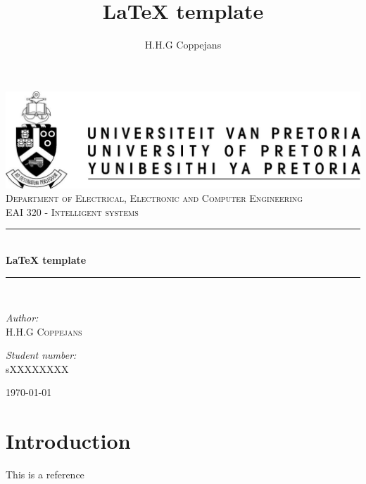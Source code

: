\documentclass[a4paper,12pt]{report}
\author{H.H.G Coppejans}
\title{ LaTeX template}
\newcommand{\HRule}{\rule{\linewidth}{0.5mm}}
\begin{document}
\setlength{\parskip}{6pt}
\begin{titlepage}

\begin{center}
\includegraphics[width=1\textwidth]{./up-logo.jpg}\\[0.4cm]    
\textsc{\LARGE Department of Electrical, Electronic and Computer Engineering}\\[1.5cm]
\textsc{\Large EAI 320 - Intelligent systems}\\[0.5cm]
\HRule \\[0.4cm]
{ \huge \bfseries LaTeX template}\\[0.4cm]
\HRule \\[0.4cm]
\begin{minipage}{0.4\textwidth}
\begin{flushleft} \large
\emph{Author:}\\
H.H.G \textsc{Coppejans}
\end{flushleft}
\end{minipage}
\begin{minipage}{0.4\textwidth}
\begin{flushright} \large
\emph{Student number:} \\
sXXXXXXXX
\end{flushright}
\end{minipage}
\vfill
{\large \today}
\end{center}
\end{titlepage}
\footnotesize

\normalsize
\setcounter{chapter}{1}
\renewcommand{\thesection}{\arabic{section}}

\section{Introduction}
This is a reference~\cite{blackman}
\end{document}
